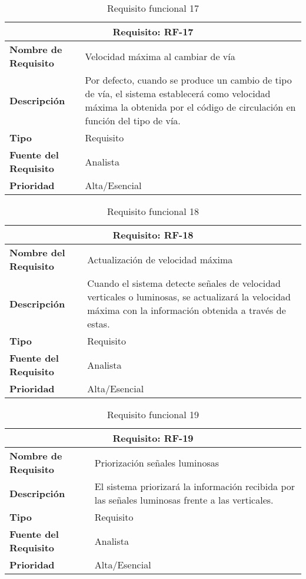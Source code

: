 \begin{table}[H]
\begin{center}
\begin{tabular}{p{} p{7cm}}
\multicolumn{2}{c}{\textbf{Requisito: RF-17} } \\
\hline \hline
\textbf{Nombre de Requisito} & Velocidad máxima al cambiar de vía  \\
\hline
\textbf{Descripción} & Por defecto, cuando se produce un cambio de tipo de vía, el sistema establecerá como velocidad máxima la obtenida por el código de circulación en función del tipo de vía.\\
\hline
\textbf{Tipo} & Requisito \\
\hline
\textbf{Fuente del Requisito} & Analista \\
\hline
\textbf{Prioridad} & Alta/Esencial \\ \hline
\end{tabular}
\caption{Requisito funcional 17}
\label{tab:RF-17}
\end{center}
\end{table}

\begin{table}[H]
\begin{center}
\begin{tabular}{p{} p{7cm}}
\multicolumn{2}{c}{\textbf{Requisito: RF-18} } \\
\hline \hline
\textbf{Nombre del Requisito} & Actualización de velocidad máxima \\
\hline
\textbf{Descripción} & Cuando el sistema detecte señales de velocidad verticales o luminosas, se actualizará la velocidad máxima con la información obtenida a través de estas. \\
\hline
\textbf{Tipo} & Requisito \\
\hline
\textbf{Fuente del Requisito} & Analista \\
\hline
\textbf{Prioridad} & Alta/Esencial \\ \hline
\end{tabular}
\caption{Requisito funcional 18}
\label{tab:RF-18}
\end{center}
\end{table}

\begin{table}[H]
\begin{center}
\begin{tabular}{p{} p{7cm}}
\multicolumn{2}{c}{\textbf{Requisito: RF-19} } \\
\hline \hline
\textbf{Nombre de Requisito} & Priorización señales luminosas \\
\hline
\textbf{Descripción} & El sistema priorizará la información recibida por las señales luminosas frente a las verticales. \\
\hline
\textbf{Tipo} & Requisito \\
\hline
\textbf{Fuente del Requisito} & Analista \\
\hline
\textbf{Prioridad} & Alta/Esencial \\ \hline
\end{tabular}
\caption{Requisito funcional 19}
\label{tab:RF-19}
\end{center}
\end{table}

